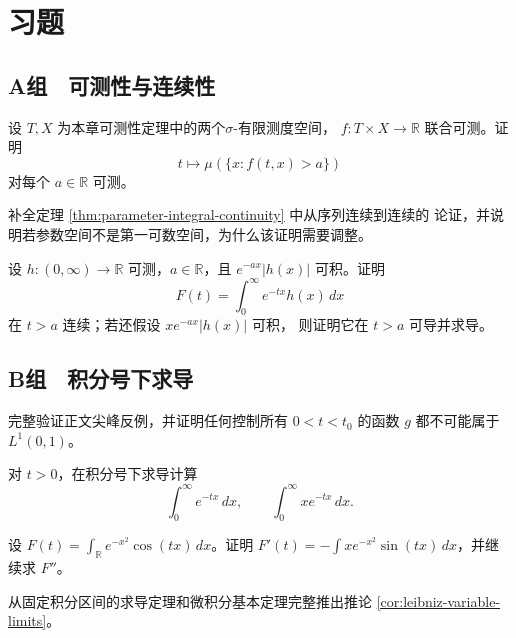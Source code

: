 \section*{习题}
\subsection*{A组　可测性与连续性}
\begin{enumerate}[label=\textbf{\thechapter.\arabic*.}]
设 \(T,X\) 为本章可测性定理中的两个\(\sigma\)-有限测度空间，
\(f:T\times X\to\mathbb R\) 联合可测。证明
\[
 t\mapsto\mu(\{x:f(t,x)>a\})
\]
对每个 \(a\in\mathbb R\) 可测。

补全定理 \ref{thm:parameter-integral-continuity} 中从序列连续到连续的
论证，并说明若参数空间不是第一可数空间，为什么该证明需要调整。

设 \(h:(0,\infty)\to\mathbb R\) 可测，\(a\in\mathbb R\)，且
\(e^{-ax}|h(x)|\) 可积。证明
\[
 F(t)=\int_0^\infty e^{-tx}h(x)\,dx
\]
在 \(t>a\) 连续；若还假设 \(xe^{-ax}|h(x)|\) 可积，
则证明它在 \(t>a\) 可导并求导。

\end{enumerate}
\subsection*{B组　积分号下求导}
\begin{enumerate}[label=\textbf{\thechapter.\arabic*.},resume]
完整验证正文尖峰反例，并证明任何控制所有
\(0<t<t_0\) 的函数 \(g\) 都不可能属于 \(L^1(0,1)\)。

对 \(t>0\)，在积分号下求导计算
\[
 \int_0^\infty e^{-tx}\,dx,\qquad
 \int_0^\infty xe^{-tx}\,dx.
\]

设 \(F(t)=\int_{\mathbb R}e^{-x^2}\cos(tx)\,dx\)。证明
\(F'(t)=-\int xe^{-x^2}\sin(tx)\,dx\)，并继续求 \(F''\)。

从固定积分区间的求导定理和微积分基本定理完整推出推论
\ref{cor:leibniz-variable-limits}。

\end{enumerate}
